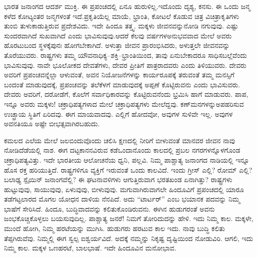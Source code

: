 ಭಾರತ ಜನಾಂಗದ ಆದರ್ಶ ಮುಕ್ತಿ. ಈ ಪ್ರಪಂಚದಲ್ಲಿ ಏನೂ ಹುರುಳಿಲ್ಲ.\break ಇದೊಂದು ದೃಶ್ಯ, ಕನಸು. ಈ ಒಂದು ಜನ್ಮ ಕಳೆದ ಕೋಟ್ಯಂತರ ಜನ್ಮಗಳಂತೆ ಇದೆ.\break ಪ್ರಕೃತಿಯೆಲ್ಲ ಮಾಯೆ, ಭ್ರಾಂತಿ, ಕೋಟಲೆ ಕೊಡುವ ಚಿತ್ರ ವಿಚಿತ್ರಾಕೃತಿಗಳು ತುಂಬಿ ತುಳುಕಾಡುತ್ತಿರುವ ಪ್ರದೇಶವಿದು. ಇದೇ ಹಿಂದೂ ತತ್ತ್ವ. ಮಕ್ಕಳು ಜೀವನವನ್ನು\break ನೋಡಿ ನಗುವುವು. ಎಷ್ಟು ಸುಂದರವಾಗಿದೆ ಸುಖವಾಗಿದೆ ಎಂದು ಭಾವಿಸುವುವು.\break ಆದರೆ ಕೆಲವು ವರ್ಷಗಳಅನುಭವವಾದ ಮೇಲೆ ಅವರು ಹೊರಟುಬಂದ ಸ್ಥಳಕ್ಕೆ\break ಪುನಃ ಹೋಗಬೇಕಾಗಿದೆ. ಅಳುತ್ತಾ ಜೀವನ ಪ್ರಾರಂಭಿಸಿದರು, ಅಳುತ್ತಲೇ ಜೀವನ\-ವನ್ನು ತೊರೆಯುವರು. ರಾಷ್ಟ್ರಗಳು ತಮ್ಮ ಯೌವನಾಧಿಕ್ಯ–ಶಕ್ತಿ–ಭ್ರಾಂತಿಯಿಂದ, ತಾವು ಏನುಬೇಕಾದರೂ ಸಾಧಿಸಬಲ್ಲೆವೆಂದು ಭಾವಿಸುವುವು. ನಾವೇ ಭೂಲೋಕದ ದೇವತೆಗಳು, ದೇವರ ಪ್ರೀತಿಗೆ ಪಾತ್ರರಾದವರು ಎಂದು ತಿಳಿಯುವರು. ದೇವರು ಅವರಿಗೆ ಪ್ರಪಂಚವನ್ನೆಲ್ಲಾ ಆಳುವಂತೆ, ಅವನ ನಿಯೋಜನೆಗಳನ್ನು ಕಾರ್ಯರೂಪಕ್ಕೆ ತರುವಂತೆ ತಮ್ಮ ಮನಸ್ಸಿಗೆ ಬಂದಂತೆ ಮಾಡುವುದಕ್ಕೆ, ಪ್ರಪಂಚವನ್ನು ತಲೆಕೆಳಗೆ ಮಾಡುವುದಕ್ಕೆ ಅಪ್ಪಣೆ ಕೊಟ್ಟಿರುವನು ಎಂದು ಭಾವಿಸುವರು. ದೇವರು ಅವರಿಗೆ, ದರೋಡೆಗೆ, ಕೊಲೆಗೆ ಸರ್ವಾಧಿಕಾರವನ್ನು ಕೊಟ್ಟಿರುವನೆಂದು ಭ್ರಮಿಸಿ ಹಾಗೆ ಮಾಡುವರು. ಪಾಪ, ಇನ್ನೂ ಅವರು ಮಕ್ಕಳು! ಚಕ್ರಾಧಿಪತ್ಯಗಳಾದ ಮೇಲೆ ಚಕ್ರಾಧಿಪತ್ಯಗಳು ಮೇಲೆದ್ದವು. ಕಣ್​ಮನಗಳನ್ನು\break ಅಪಹರಿಸುವ ಉಚ್ಛ್ರಾಯ ಸ್ಥಿತಿಗೆ ಏರಿದವು. ಈಗ ಮಾಯವಾದವು. ಎಲ್ಲಿಗೆ ಹೋದವೋ, ಅವುಗಳ ಸುಳಿವೇ ಇಲ್ಲ. ಅವುಗಳ ಅವನತಿಯೂ ಅಷ್ಟೇ ಬೀಭತ್ಸವಾಗಿರಬಹುದು.

ಕಮಲದ ಎಲೆಯ ಮೇಲೆ ಜಲಬಿಂದುವೊಂದು ಚಲಿಸಿ ಕ್ಷಣದಲ್ಲಿ ನೀರಿಗೆ ಬೀಳುವಂತೆ ಮಾನವರ ಜೀವನ ನಾವು ನೋಡಿದೆಡೆಯಲ್ಲಿ ನಾಶ. ಈಗ ದಟ್ಟಕಾನನವಿರುವ ಕಡೆ\break ಒಂದಾನೊಂದು ಕಾಲದಲ್ಲಿ ಪ್ರಬಲ ನಗರಗಳನ್ನೊಳಗೊಂಡ ಚಕ್ರಾಧಿಪತ್ಯವಿತ್ತು. ಇದೇ ಭಾರತೀಯ ಆಲೋಚನೆಯ ಧ್ವನಿ, ಪಲ್ಲವಿ. ನಿಮ್ಮ ಪಾಶ್ಚಾತ್ಯ ಜನಾಂಗದ ನಾಡಿಯಲ್ಲಿ ಇನ್ನೂ ಹೊಸ ರಕ್ತ ಹರಿಯುತ್ತಿದೆ. ರಾಷ್ಟ್ರಗಳಿಗೂ ವ್ಯಕ್ತಿಗೆ ಇರುವಂತೆ ಒಂದು ಕಾಲವಿದೆ. ಇಂದು ಗ್ರೀಸ್​ ಎಲ್ಲಿ? ರೋಮ್​ ಎಲ್ಲಿ? ಬಲಾಢ್ಯ ಸ್ಪೈಯಿನ್​ ಜನಾಂಗವೆಲ್ಲಿ? ಈ ಘಟನಾವಳಿಗಳು ಆಗುತ್ತಿರುವಾಗ ಭರತಖಂಡ ಏನಾಗಿತ್ತು? ರಾಷ್ಟ್ರಗಳು ಹುಟ್ಟುವುವು, ಸಾಯುವುವು, ಏಳುವುವು, ಬೀಳುವುವು. ಮಗುವಾಗಿರುವಾಗಲೇ ಹಿಂದೂವಿಗೆ ಪ್ರಪಂಚದಲ್ಲಿ ಯಾರೂ ತಡೆಗಟ್ಟಲಾರದ ಮೊಗಲ ಯೋಧನ ದಾಳಿಯ ನೆನಪಿದೆ. ಅದು “ಟಾರ್ಟರ್​” ಎಂಬ ಭಯಾನಕ ಪದವನ್ನು ನಿಮ್ಮ ಭಾಷೆಗೆ ಸೇರಿಸಿದೆ. ಹಿಂದೂ, ಬುದ್ಧಿವಾದವನ್ನು ಕಲಿತುಕೊಂಡಿರುವನು. ಈಗಿನ ಹುಡುಗರಂತೆ ಅವನು ಜಂಭಕೊಚ್ಚಿಕೊಳ್ಳಲು ಬಯಸುವುದಿಲ್ಲ. ಪಾಶ್ಚಾತ್ಯ ಜನರೆ! ನಿಮಗೆ ತೋರಿದುದನ್ನು ಹೇಳಿ. ಇದು ನಿಮ್ಮ ಕಾಲ. ಮಕ್ಕಳೇ, ಮುಂದೆ ಹೋಗಿ, ನಿಮ್ಮ ಹರಟೆಯನ್ನು ಮುಗಿಸಿ. ಹುಡುಗರು ಹರಟುವ ಕಾಲ ಇದು. ನಾವು ಬುದ್ಧಿ ಕಲಿತು ತೆಪ್ಪಗಿರುವೆವು. ನಿಮ್ಮಲ್ಲಿ ಈಗ ಸ್ವಲ್ಪ ಐಶ್ವರ್ಯವಿದೆ. ಅದಕ್ಕೆ ನಮ್ಮನ್ನು ನಿಕೃಷ್ಟ ದೃಷ್ಟಿಯಿಂದ ನೋಡುವಿರಿ. ಆಗಲಿ, ಇದು ನಿಮ್ಮ ಕಾಲ. ಮಕ್ಕಳ ಒಣಹರಟೆ, ಬಾಲಭಾಷೆ. ಇದೇ ಹಿಂದೂವಿನ ಮನೋಭಾವ.

